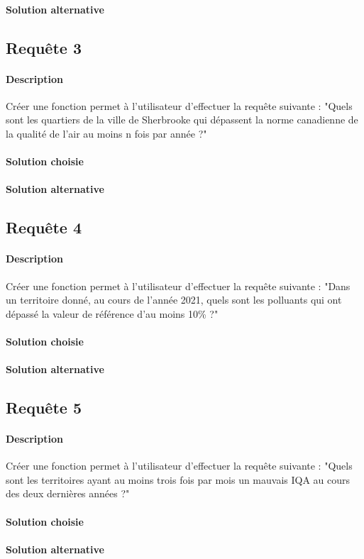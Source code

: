 \documentclass{article}
\begin{document}
\paragraph{Solution alternative}

\subsection{Requête 3}
\paragraph{Description} Créer une fonction permet à l'utilisateur
d'effectuer la requête suivante : "Quels sont les quartiers de la ville
de Sherbrooke qui dépassent la norme canadienne de la qualité de l'air
au moins n fois par année ?"

\paragraph{Solution choisie}

\paragraph{Solution alternative}

\subsection{Requête 4}
\paragraph{Description} Créer une fonction permet à l'utilisateur
d'effectuer la requête suivante : "Dans un territoire donné, au cours de
l'année 2021, quels sont les polluants qui ont dépassé la valeur de 
référence d'au moins 10\% ?"

\paragraph{Solution choisie}

\paragraph{Solution alternative}

\subsection{Requête 5}
\paragraph{Description} Créer une fonction permet à l'utilisateur
d'effectuer la requête suivante : "Quels sont les territoires ayant au
moins trois fois par mois un mauvais IQA au  cours des deux dernières
années ?"

\paragraph{Solution choisie}

\paragraph{Solution alternative}
\end{document}
